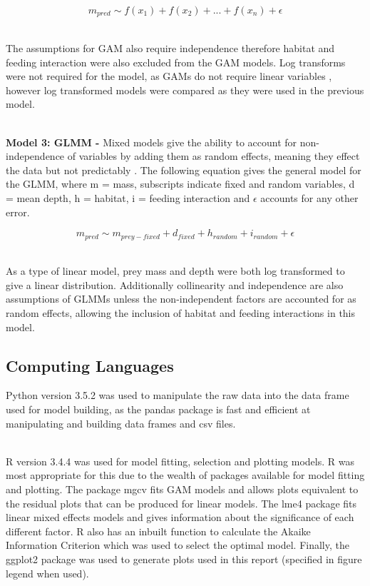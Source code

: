 \documentclass[11pt,a4paper]{article}
\begin{document}
		\begin{equation*}
			m_{pred} \sim f(x_{1}) + f(x_{2}) + ... + f(x_{n}) + \epsilon
		\end{equation*}
		
	\noindent ~\\ The assumptions for GAM also require independence therefore habitat and feeding interaction were also excluded from the GAM models. Log transforms were not required for the model, as GAMs do not require linear variables \citep{Zuur2009}, however log transformed models were compared as they were used in the previous model.
	
	\par \noindent ~\\ \textbf{Model 3: GLMM -} Mixed models give the ability to account for non-independence of variables by adding them as random effects, meaning they effect the data but not predictably \citep{Zuur2009}. The following equation gives the general model for the GLMM, where m = mass, subscripts indicate fixed and random variables, d = mean depth, h = habitat, i = feeding interaction and $\epsilon$ accounts for any other error.
	
		\begin{equation*}
			m_{pred} \sim m_{prey - fixed} + d_{fixed} + h_{random} + i_{random} + \epsilon
		\end{equation*}
		
	\par \noindent ~\\ As a type of linear model, prey mass and depth were both log transformed to give a linear distribution. Additionally collinearity and independence are also assumptions of GLMMs unless the non-independent factors are accounted for as random effects, allowing the inclusion of habitat and feeding interactions in this model. 


	\subsection{Computing Languages}
	
	\par \noindent Python version 3.5.2 \citep{PythonCoreTeam2018} was used to manipulate the raw data into the data frame used for model building, as the pandas package \citep{mckinney-proc-scipy-2010} is fast and efficient at manipulating and building data frames and csv files.
	\par \noindent ~\\R version 3.4.4 \citep{RCoreTeam2018} was used for model fitting, selection and plotting models. R was most appropriate for this due to the wealth of packages available for model fitting and plotting. The package mgcv \citep{Wood2011} fits GAM models and allows plots equivalent to the residual plots that can be produced for linear models. The lme4 package \citep{Bates2015} fits linear mixed effects models and gives information about the significance of each different factor. R also has an inbuilt function to calculate the Akaike Information Criterion which was used to select the optimal model. Finally, the ggplot2 \citep{Wickham2016} package was used to generate plots used in this report (specified in figure legend when used).
	
\end{document}
